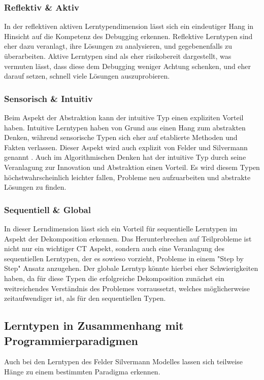 \subsubsection{Reflektiv & Aktiv}
In der reflektiven aktiven Lerntypendimension lässt sich ein eindeutiger Hang in Hinsicht auf die Kompetenz des Debugging erkennen. Reflektive Lerntypen sind eher dazu veranlagt, ihre Lösungen zu analysieren, und gegebenenfalls zu überarbeiten. Aktive Lerntypen sind als eher risikobereit dargestellt, was vermuten lässt, dass diese dem Debugging weniger Achtung schenken, und eher darauf setzen, schnell viele Lösungen auszuprobieren.

\subsubsection{Sensorisch & Intuitiv}
Beim Aspekt der Abstraktion kann der intuitive Typ einen expliziten Vorteil haben. Intuitive Lerntypen haben von Grund aus einen Hang zum abstrakten Denken, während sensorische Typen sich eher auf etablierte Methoden und Fakten verlassen. Dieser Aspekt wird auch explizit von Felder und Silvermann genannt \cite{felderhandout}. 
Auch im Algorithmischen Denken hat der intuitive Typ durch seine Veranlagung zur Innovation und Abstraktion einen Vorteil. Es wird diesem Typen höchstwahrscheinlich leichter fallen, Probleme neu aufzuarbeiten und abstrakte Lösungen zu finden.

\subsubsection{Sequentiell & Global}
In dieser Lerndimension lässt sich ein Vorteil für sequentielle Lerntypen im Aspekt der Dekomposition erkennen. Das Herunterbrechen auf Teilprobleme ist nicht nur ein wichtiger CT Aspekt, sondern auch eine Veranlagung des sequentiellen Lerntypen, der es sowieso vorzieht, Probleme in einem "Step by Step" Ansatz anzugehen. Der globale Lerntyp könnte hierbei eher Schwierigkeiten haben, da für diese Typen die erfolgreiche Dekomposition zunächst ein weitreichendes Verständnis des Problemes vorraussetzt, welches möglicherweise zeitaufwendiger ist, als für den sequentiellen Typen.

\subsection{Lerntypen in Zusammenhang mit Programmierparadigmen}
Auch bei den Lerntypen des Felder Silvermann Modelles lassen sich teilweise Hänge zu einem bestimmten Paradigma erkennen.

